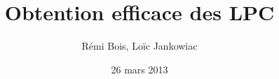 \documentclass{beamer}
\title{Obtention efficace des LPC}
\author{Rémi Bois, Loïc Jankowiac}
\date{26 mars 2013}
\begin{document}
\begin{frame}
  \maketitle

\end{frame}
\end{document}

